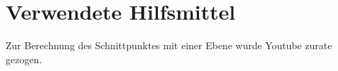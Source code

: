 \chapter{Verwendete Hilfsmittel}\label{ch:verwendete-hilfsmittel}
Zur Berechnung des Schnittpunktes mit einer Ebene wurde Youtube zurate gezogen.